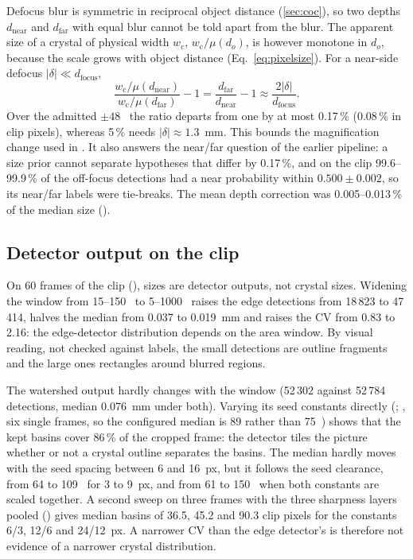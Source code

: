\label{sec:ambiguity}Defocus blur is symmetric in reciprocal object distance (\ref{sec:coc}), so two depths
$d_\mathrm{near}$ and $d_\mathrm{far}$ with equal blur cannot be told apart from the blur. The apparent size of a crystal
of physical width $w_\mathrm{c}$, $w_\mathrm{c} / \mu(d_o)$, is however monotone in $d_o$, because the scale grows
with object distance (Eq.~\ref{eq:pixelsize}). For a near-side defocus $|\delta| \ll d_\mathrm{focus}$,
\begin{equation}\label{eq:ratio}
\frac{w_\mathrm{c}/\mu(d_\mathrm{near})}{w_\mathrm{c}/\mu(d_\mathrm{far})} - 1 = \frac{d_\mathrm{far}}{d_\mathrm{near}} - 1
\approx \frac{2|\delta|}{d_\mathrm{focus}}.
\end{equation}
Over the admitted $\pm 48$~\um{} the ratio departs from one by at most 0.17\,\% (0.08\,\% in clip pixels), whereas
5\,\% needs $|\delta| \approx 1.3$~mm. This bounds the magnification change used in
. It also answers the near/far question of the earlier pipeline: a size prior cannot separate
hypotheses that differ by 0.17\,\%, and on the clip 99.6--99.9\,\% of the off-focus detections had a near probability
within $0.500 \pm 0.002$, so its near/far labels were tie-breaks. The mean depth correction was 0.005--0.013\,\% of the
median size ().


\subsection{Detector output on the clip}\label{sec:csd-edge}

On 60 frames of the clip (), sizes are detector outputs, not crystal sizes.
Widening the window from 15--150~\um{} to 5--1000~\um{} raises the edge detections from 18\,823 to 47\,414, halves the
median from 0.037 to 0.019~mm and raises the CV from 0.83 to 2.16: the edge-detector distribution depends on the area
window. By visual reading, not checked against labels, the small detections are outline fragments and the large ones
rectangles around blurred regions.

\label{sec:watershed}The watershed output hardly changes with the window (52\,302 against 52\,784 detections, median
0.076~mm under both). Varying its seed constants directly (; , six single frames, so the configured median is 89 rather than 75~\um) shows that the kept basins cover
86\,\% of the cropped frame: the detector tiles the picture whether or not a crystal outline separates the basins. The
median hardly moves with the seed spacing between 6 and 16~px, but it follows the seed clearance, from 64 to 109~\um{}
for 3 to 9~px, and from 61 to 150~\um{} when both constants are scaled together. A second sweep on three frames with the
three sharpness layers pooled () gives median basins of 36.5, 45.2 and
90.3 clip pixels for the constants 6/3, 12/6 and 24/12~px. A narrower CV than the edge
detector's is therefore not evidence of a narrower crystal distribution.


